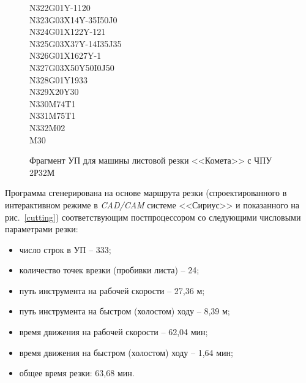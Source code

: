 \documentclass[11pt,twoside,openany]{report}
\begin{document}
\begin{figure}
\begin{multicols}{3}
  N322G01Y-1120 \\
  N323G03X14Y-35I50J0 \\
  N324G01X122Y-121  \\
  N325G03X37Y-14I35J35  \\
  N326G01X1627Y-1 \\
  N327G03X50Y50I0J50  \\
  N328G01Y1933  \\
  N329X20Y30  \\
  N330M74T1 \\
  N331M75T1 \\
  N332M02 \\
  M30
\end{multicols}
\caption{Фрагмент УП для машины листовой резки <<Комета>> с ЧПУ 2Р32М }
\label{control-program}
\end{figure}

Программа сгенерирована на основе маршрута резки
(спроектированного в интерактивном режиме в
\textit{CAD/CAM} системе <<Сириус>>
и показанного на рис.~\ref{cutting})
соответствующим постпроцессором со
следующими числовыми параметрами резки:
\begin{itemize}
  \item	число строк в УП – 333;
  \item	количество точек врезки (пробивки листа) – 24;
  \item	путь инструмента на рабочей скорости – 27,36 м;
  \item	путь инструмента на быстром (холостом) ходу – 8,39 м;
  \item	время движения на рабочей скорости – 62,04 мин;
  \item	время движения на быстром (холостом) ходу – 1,64 мин;
  \item	общее время резки: 63,68 мин.
\end{itemize}
\end{document}
